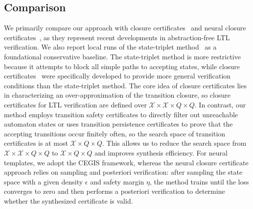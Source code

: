 \subsection{Comparison}
We primarily compare our approach with closure certificates~\cite{murali2024closure} and neural closure certificates~\cite{nadali2024neural}, as they represent recent developments in abstraction-free LTL verification. We also report local runs of the state-triplet method~\cite{wongpiromsarn2015automata} as a foundational conservative baseline. The state-triplet method is more restrictive because it attempts to block all simple paths to accepting states, while closure certificates~\cite{murali2024closure} were specifically developed to provide more general verification conditions than the state-triplet method. The core idea of closure certificates lies in characterizing an over-approximation of the transition closure, so closure certificates for LTL verification are defined over $\mathcal{X} \times \mathcal{X} \times Q \times Q$. In contrast, our method employs transition safety certificates to directly filter out unreachable automaton states or uses transition persistence certificates to prove that the accepting transitions occur finitely often, so the search space of transition certificates is at most $\mathcal{X} \times Q \times Q$. This allows us to reduce the search space from $\mathcal{X} \times \mathcal{X} \times Q \times Q$ to $\mathcal{X} \times Q \times Q$ and improves synthesis efficiency. For neural templates, we adopt the CEGIS framework, whereas the neural closure certificate approach relies on sampling and posteriori verification: after sampling the state space with a given density $\epsilon$ and safety margin $\eta$, the method trains until the loss converges to zero and then performs a posteriori verification to determine whether the synthesized certificate is valid.

